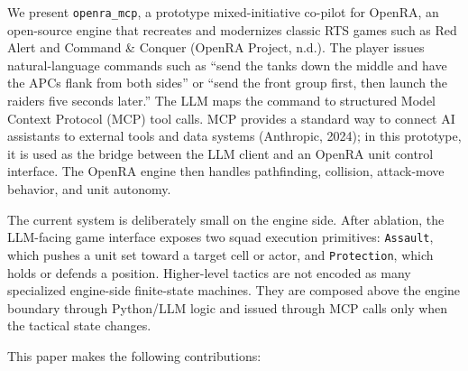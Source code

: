 \documentclass[
  journal]{IEEEtran}
\begin{document}
We present \texttt{openra\_mcp}, a prototype mixed-initiative co-pilot
for OpenRA, an open-source engine that recreates and modernizes classic
RTS games such as Red Alert and Command \& Conquer (OpenRA Project,
n.d.). The player issues natural-language commands such as ``send the
tanks down the middle and have the APCs flank from both sides'' or
``send the front group first, then launch the raiders five seconds
later.'' The LLM maps the command to structured Model Context Protocol
(MCP) tool calls. MCP provides a standard way to connect AI assistants
to external tools and data systems (Anthropic, 2024); in this prototype,
it is used as the bridge between the LLM client and an OpenRA unit
control interface. The OpenRA engine then handles pathfinding,
collision, attack-move behavior, and unit autonomy.

The current system is deliberately small on the engine side. After
ablation, the LLM-facing game interface exposes two squad execution
primitives: \texttt{Assault}, which pushes a unit set toward a target
cell or actor, and \texttt{Protection}, which holds or defends a
position. Higher-level tactics are not encoded as many specialized
engine-side finite-state machines. They are composed above the engine
boundary through Python/LLM logic and issued through MCP calls only when
the tactical state changes.

This paper makes the following contributions:
\end{document}

